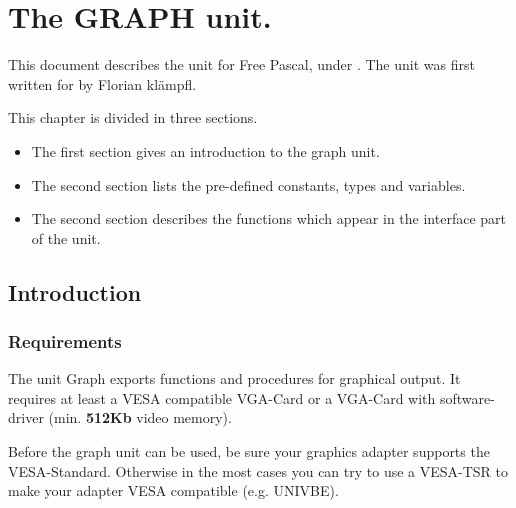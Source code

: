 %
%
%
%
%
\chapter{The GRAPH unit.}
This document describes the  unit for Free Pascal, under \dos.
The unit was first written for \dos by Florian kl\"ampfl. 

This chapter is divided in three sections. 
\begin{itemize}
\item The first section gives an introduction to the graph unit.
\item The second section lists the pre-defined constants, types and variables. 
\item The second section describes the functions which appear in the
interface part of the  unit.
\end{itemize}

\section{Introduction}
\label{se:Introduction}
\subsection{Requirements}
The unit Graph exports functions and procedures for graphical output.
It requires at least a VESA compatible VGA-Card or a VGA-Card with software-driver
(min. \textbf{512Kb} video memory).

Before the graph unit can be used, be sure your graphics adapter supports
the VESA-Standard. Otherwise in the most cases you can try to use a VESA-TSR
to make your adapter VESA compatible (e.g. UNIVBE).

